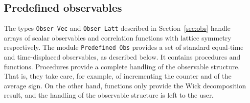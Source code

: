 %
\subsection{Predefined observables} \label{sec:predefined_observales}

The types \texttt{Obser\_Vec} and \texttt{Obser\_Latt} described in Section~\ref{sec:obs} handle arrays of scalar observables and correlation functions with lattice symmetry respectively.
The module \texttt{Predefined\_Obs} provides a set of standard equal-time and time-displaced observables, as described below.  
It contains procedures and functions.   Procedures  provide a complete handling of the observable structure. That is, they take care, for example, of incrementing the counter and of the average sign. On the other hand, functions only provide the Wick decomposition result, and the handling of the observable structure is left to the user. 

